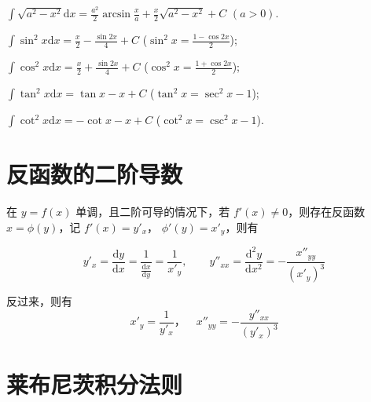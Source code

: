 \documentclass[lang=cn,math=mtpro2,10pt,scheme=chinese,black]{elegantbook}
\begin{document}
\vspace{1em}

$\displaystyle \int \sqrt{a^2 - x^2} \mathrm{d}x = \frac{a^2}{2} \arcsin \frac{x}{a} + \frac{x}{2} \sqrt{a^2 - x^2} + C$ \qquad $(a > 0)$.

\vspace{1em}

$\displaystyle \int \sin^2 x \mathrm{d}x = \frac{x}{2} - \frac{\sin 2x}{4} + C$ \qquad ($\sin^2 x = \displaystyle \frac{1-\cos 2x}{2}$);

$\displaystyle \int \cos^2 x \mathrm{d}x = \frac{x}{2} + \frac{\sin 2x}{4} + C$ \qquad ($\cos^2 x = \displaystyle \frac{1+\cos 2x}{2}$);

$\displaystyle \int \tan^2 x \mathrm{d}x = \tan x - x + C$ \qquad ($\tan^2 x = \sec^2 x - 1$);

$\displaystyle \int \cot^2 x \mathrm{d}x = -\cot x - x + C$ \qquad ($\cot^2 x = \csc^2 x - 1$).


\section{反函数的二阶导数}

在 $y=f(x)$ 单调，且二阶可导的情况下，若 $f'(x) \neq 0$，则存在反函数 $x = \phi(y)$，记 $f'(x) = y'_x$，
$\phi'(y) = x'_y$，则有

$$ y'_x = \frac{\mathrm{d}y}{\mathrm{d}x} = \frac{1}{\frac{\mathrm{d}x}{\mathrm{d}y}} = \frac{1}{x'_y}, \qquad y''_{xx} = \frac{\mathrm{d}^2 y}{\mathrm{d}x^2} = -\frac{x''_{yy}}{(x'_y)^3} $$

反过来，则有
$$ x'_y = \frac{1}{y'_x} \text{，} \quad x''_{yy} = -\frac{y''_{xx}}{(y'_x)^3} $$



\section{莱布尼茨积分法则}
\end{document}
